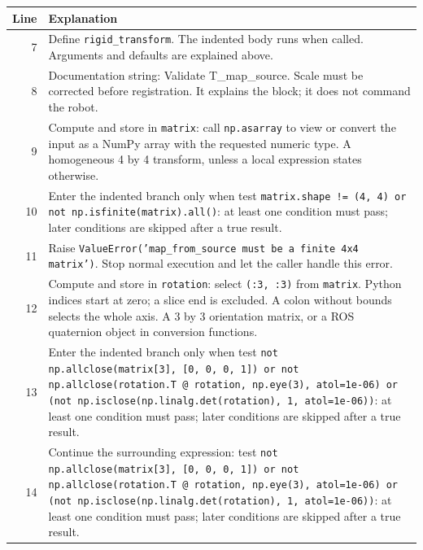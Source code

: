 \documentclass[11pt,a4paper]{book}
\begin{document}
\begin{longtable}{r p{}}

\textbf{Line} & \textbf{Explanation} \\ \hline \endhead

7 & Define \texttt{rigid\_transform}. The indented body runs when called. Arguments and defaults are explained above. \\

8 & Documentation string: Validate T\_map\_source. Scale must be corrected before registration. It explains the block; it does not command the robot. \\

9 & Compute and store in \texttt{matrix}: call \texttt{np.asarray} to view or convert the input as a NumPy array with the requested numeric type. A homogeneous 4 by 4 transform, unless a local expression states otherwise. \\

10 & Enter the indented branch only when test \texttt{matrix.shape != (4, 4) or not np.isfinite(matrix).all()}: at least one condition must pass; later conditions are skipped after a true result. \\

11 & Raise \texttt{ValueError('map\_from\_source must be a finite 4x4 matrix')}. Stop normal execution and let the caller handle this error. \\

12 & Compute and store in \texttt{rotation}: select \texttt{(:3, :3)} from \texttt{matrix}. Python indices start at zero; a slice end is excluded. A colon without bounds selects the whole axis. A 3 by 3 orientation matrix, or a ROS quaternion object in conversion functions. \\

13 & Enter the indented branch only when test \texttt{not np.allclose(matrix[3], [0, 0, 0, 1]) or not np.allclose(rotation.T @ rotation, np.eye(3), atol=1e-06) or (not np.isclose(np.linalg.det(rotation), 1, atol=1e-06))}: at least one condition must pass; later conditions are skipped after a true result. \\

14 & Continue the surrounding expression: test \texttt{not np.allclose(matrix[3], [0, 0, 0, 1]) or not np.allclose(rotation.T @ rotation, np.eye(3), atol=1e-06) or (not np.isclose(np.linalg.det(rotation), 1, atol=1e-06))}: at least one condition must pass; later conditions are skipped after a true result. \\


\end{longtable}
\end{document}
